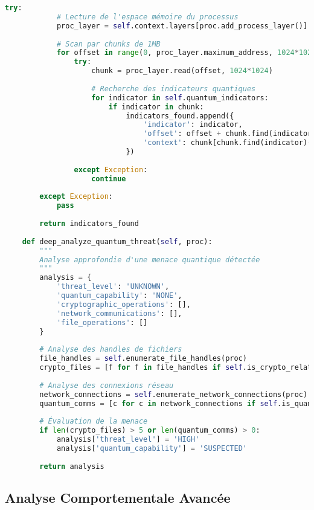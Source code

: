 \begin{lstlisting}[language=Python, caption=Plugin Volatility 3 pour détection d'attaques post-quantiques]
        try:
            # Lecture de l'espace mémoire du processus
            proc_layer = self.context.layers[proc.add_process_layer()]
            
            # Scan par chunks de 1MB
            for offset in range(0, proc_layer.maximum_address, 1024*1024):
                try:
                    chunk = proc_layer.read(offset, 1024*1024)
                    
                    # Recherche des indicateurs quantiques
                    for indicator in self.quantum_indicators:
                        if indicator in chunk:
                            indicators_found.append({
                                'indicator': indicator,
                                'offset': offset + chunk.find(indicator),
                                'context': chunk[chunk.find(indicator)-50:chunk.find(indicator)+50]
                            })
                            
                except Exception:
                    continue
                    
        except Exception:
            pass
            
        return indicators_found
    
    def deep_analyze_quantum_threat(self, proc):
        """
        Analyse approfondie d'une menace quantique détectée
        """
        analysis = {
            'threat_level': 'UNKNOWN',
            'quantum_capability': 'NONE',
            'cryptographic_operations': [],
            'network_communications': [],
            'file_operations': []
        }
        
        # Analyse des handles de fichiers
        file_handles = self.enumerate_file_handles(proc)
        crypto_files = [f for f in file_handles if self.is_crypto_related(f)]
        
        # Analyse des connexions réseau
        network_connections = self.enumerate_network_connections(proc)
        quantum_comms = [c for c in network_connections if self.is_quantum_related(c)]
        
        # Évaluation de la menace
        if len(crypto_files) > 5 or len(quantum_comms) > 0:
            analysis['threat_level'] = 'HIGH'
            analysis['quantum_capability'] = 'SUSPECTED'
            
        return analysis
\end{lstlisting}

\subsection{Analyse Comportementale Avancée}

